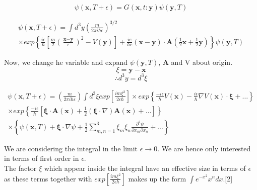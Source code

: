 \documentclass[14pt]{extarticle}
\begin{document}
$$\psi(\textbf{x},T+\epsilon) = G(\textbf{x},t:\textbf{y}) \psi(\textbf{y},T)$$


\begin{multline}
 \psi(\textbf{x},T+\epsilon) =  \int d^3 y \left( \frac{m}{2 \pi i \hbar \epsilon} \right)^{3/2} \nonumber \\ \times exp \left\lbrace \frac{i\epsilon}{\hbar} \left[ \frac{m}{2} \left( \frac{\textbf{x}-\textbf{y}}{\epsilon} \right)^2 -V(\textbf{y}) \right] + \frac{ie}{\hbar c} (\textbf{x}-\textbf{y}) \cdot \textbf{A} \left( \frac{1}{2} \textbf{x} + \frac{1}{2} \textbf{y} \right)  \right\rbrace \psi(\textbf{y},T) \nonumber 
\end{multline}


Now, we change he variable and expand $\psi(\textbf{y},T)$, $\textbf{A}$ and V about origin.
$$\textbf{$\xi$} = \textbf{y} - \textbf{x}  $$
$$\therefore d^3y=d^3 \xi$$









\begin{multline}
\psi(\textbf{x},T+\epsilon) =\left( \frac{m}{2 \pi i \hbar \epsilon} \right) \int d^3 \xi exp{\left[ \frac{im \xi^2}{2 \epsilon \hbar} \right]} \times  exp \left\lbrace \frac{-i \epsilon}{\hbar} V(\textbf{x}) - \frac{i \epsilon}{\hbar} \nabla V(\textbf{x}) \cdot  \boldsymbol{\xi}  + \dots \right\rbrace \\ 
\times exp \left\lbrace \frac{-i \epsilon}{\hbar} \left[ \boldsymbol{\xi} \cdot \textbf{A}(\textbf{x}) + \frac{1}{2} (\boldsymbol{\xi} \cdot \nabla) \textbf{A}(\textbf{x})+ \dots \right]  \right\rbrace \nonumber \\ \times  \left\lbrace \psi(\textbf{x},T) + \boldsymbol{\xi} \cdot \nabla \psi + \frac{1}{2} \sum_{m,n=1}^3 \xi_m \xi_n \frac{\partial^2 \psi}{\partial x_m \partial x_n} + \dots \right\rbrace
\end{multline}












We are considering the integral in the limit $\epsilon \rightarrow 0$. We are hence only interested in terms of first order in $\epsilon$.\\

The factor $\xi$ which appear inside the integral have an effective size in terms of $\epsilon$ as these terms together with $exp[\frac{im \xi^2}{2 \epsilon \hbar}]$ makes up the form $\int e^{-x^2} x^n dx$.[2]\\
\end{document}
